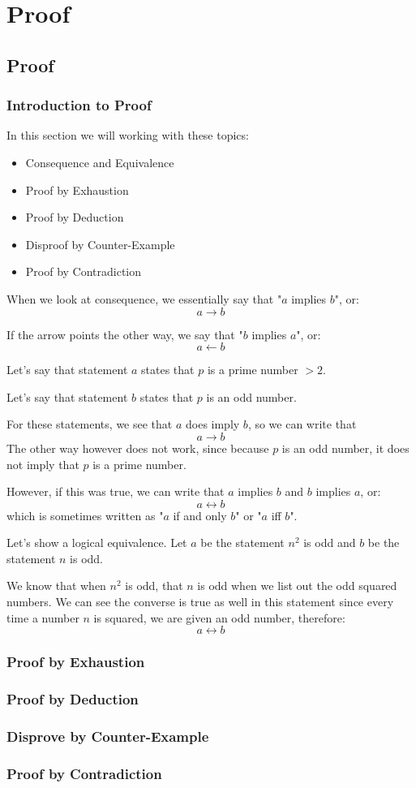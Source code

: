 \documentclass[../alevelmaths.tex]{subfiles}
\begin{document}
\chapter{Proof}
\section{Proof}
\subsection*{Introduction to Proof}
In this section we will working with these topics:
\begin{itemize}
    \item Consequence and Equivalence
    \item Proof by Exhaustion
    \item Proof by Deduction
    \item Disproof by Counter-Example
    \item Proof by Contradiction
\end{itemize}

When we look at consequence, we essentially say that "$a$ implies $b$", or:
\[a\rightarrow b\]

If the arrow points the other way, we say that "$b$ implies $a$", or:
\[a\leftarrow b\]

Let's say that statement $a$ states that $p$ is a prime number $>2$.

Let's say that statement $b$ states that $p$ is an odd number.

For these statements, we see that $a$ does imply $b$, so we can write that
\[a\rightarrow b\]
The other way however does not work, since because $p$ is an odd number, it does not imply that $p$ is a prime number.

However, if this was true, we can write that $a$ implies $b$ and $b$ implies $a$, or:
\[a\leftrightarrow b\]
which is sometimes written as "$a$ if and only $b$" or "$a$ iff $b$".

Let's show a logical equivalence. Let $a$ be the statement $n^2$ is odd and $b$ be the statement $n$ is odd.

We know that when $n^2$ is odd, that $n$ is odd when we list out the odd squared numbers. We can see the converse is true as well in this statement since every time a number $n$ is squared, we are given an odd number, therefore:
\[a\leftrightarrow b\]
\subsection*{Proof by Exhaustion}
\subsection*{Proof by Deduction}
\subsection*{Disprove by Counter-Example}
\subsection*{Proof by Contradiction}
\end{document}
